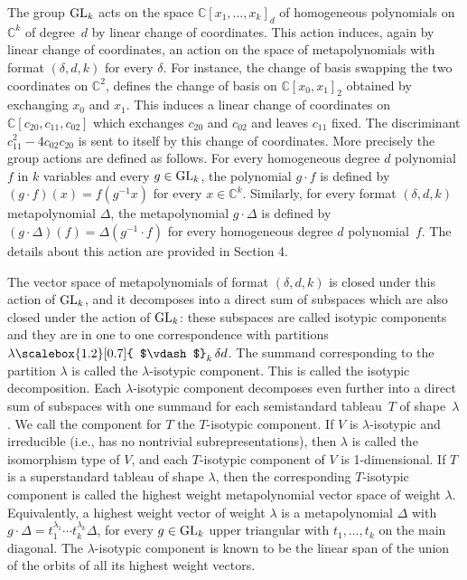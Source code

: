 \documentclass[10pt,a4paper]{article}
\begin{document}
The group $\textnormal{GL}_{k}$ acts on the space $\mathbb{C}[x_{1},\ldots,x_{k}]_{d}$ of homogeneous polynomials on $\mathbb{C}^{k}$ of degree $d$ by linear change of coordinates. This action induces, again by linear change of coordinates, an action on the space of metapolynomials with format $(\delta,d,k)$ for every $\delta$.
For instance, the change of basis swapping the two coordinates on $\mathbb{C}^{2}$, defines the change of basis on $\mathbb{C}[x_{0},x_{1}]_{2}$ obtained by exchanging $x_{0}$ and $x_{1}$. This induces a linear change of coordinates on $\mathbb{C}[c_{20},c_{11},c_{02}]$ which exchanges $c_{20}$ and $c_{02}$ and leaves $c_{11}$ fixed. The discriminant $c_{11}^{2}-4c_{02}c_{20}$ is sent to itself by this change of coordinates.
More precisely the group actions are defined as follows. For every homogeneous degree $d$ polynomial $f$ in $k$ variables and every $g\in\textnormal{GL}_{k}$, the polynomial $g\cdot f$ is defined by $(g\cdot f)(x)=f(g^{-1}x)$ for every $x\in\mathbb{C}^{k}$. Similarly, for every format $(\delta,d,k)$ metapolynomial $\Delta$, the metapolynomial $g\cdot\Delta$ is defined by $(g\cdot\Delta)(f)=\Delta(g^{-1}\cdot f)$ for every homogeneous degree $d$ polynomial $f$. The details about this action are provided in Section 4.





The vector space of metapolynomials of format $(\delta,d,k)$ is closed under this action of $\textnormal{GL}_{k}$, and it decomposes into a direct sum of subspaces which are also closed under the action of $\textnormal{GL}_{k}$: these subspaces are called isotypic components and they are in one to one correspondence with partitions $\lambda\mathchoice{\scalebox{1.2}[0.7]{ $\vdash$}_{k}\,}{\scalebox{1.2}[0.7]{ $\vdash$}_{k}\,}{\scalebox{0.7}{\scalebox{1.2}[0.7]{$\vdash$}}_{k}\,}{\scalebox{0.5}{\scalebox{1.2}[0.7]{$\vdash$}}_{k}\,}{\delta d}$.
The summand corresponding to the partition $\lambda$ is called the $\lambda$-isotypic component. This is called the isotypic decomposition. Each $\lambda$-isotypic component decomposes even further into a direct sum of subspaces with one summand for each semistandard tableau $T$ of shape $\lambda$.
We call the component for $T$ the $T$-isotypic component.
If $V$ is $\lambda$-isotypic and irreducible (i.e., has no nontrivial subrepresentations), then $\lambda$ is called the isomorphism type of $V$, and each $T$-isotypic component of $V$ is 1-dimensional.
If $T$ is a superstandard tableau of shape $\lambda$, then the corresponding $T$-isotypic component is called the highest weight metapolynomial vector space of weight $\lambda$.
Equivalently, a highest weight vector of weight $\lambda$ is a metapolynomial $\Delta$ with $g\cdot\Delta=t_{1}^{\lambda_{1}}\cdots t_{k}^{\lambda_{k}}\Delta$, for every $g\in\textnormal{GL}_{k}$ upper triangular with $t_{1},\ldots,t_{k}$ on the main diagonal. The $\lambda$-isotypic component is known to be the linear span of the union of the orbits of all its highest weight vectors.
\end{document}
